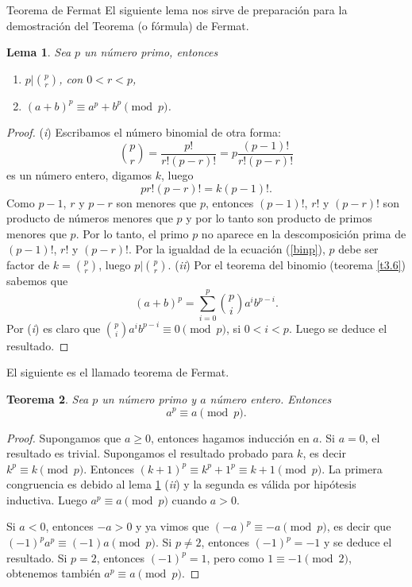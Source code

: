 \documentclass[11pt,spanish,makeidx]{amsbook}
\newtheorem{teorema}{Teorema}[section]
\newtheorem{lema}[teorema]{Lema}
\theoremstyle{definition}
\theoremstyle{remark}
\begin{document}
\begin{section}{Teorema de Fermat}  
El siguiente lema nos sirve de preparación para la demostración del Teorema (o fórmula) de Fermat.

\begin{lema} \label{l4.3} Sea $p$ un número primo, entonces
\begin{enumerate}
\item[({\em i})] $p|\binom{p}{r}$, con $0< r <p$,
\item[({\em ii})] $(a+b)^p \equiv a^p+b^p \pmod{p}$.
\end{enumerate}
\end{lema}
\begin{proof} ({\em i})  Escribamos el número binomial de otra forma: 
$$
\binom{p}{r}=\frac{p!}{r!(p-r)!}=p\frac{(p-1)!}{r!(p-r)!}
$$ 
es un número entero, digamos $k$, luego 
\begin{equation}\label{binp}
p r!(p-r)! = k(p-1)!.
\end{equation}
Como $p-1$, $r$ y $p-r$ son menores que $p$, entonces  $(p-1)!$, $r!$ y $(p-r)!$ son producto de números menores que $p$ y por lo tanto son producto de primos menores que $p$.  Por lo tanto, el primo $p$ no aparece en la descomposición prima de $(p-1)!$, $r!$ y $(p-r)!$. Por la igualdad de la ecuación (\ref{binp}), $p$ debe ser factor de $k = \binom{p}{r}$, luego $p|\binom{p}{r}$.  ({\em ii}) Por el teorema del binomio (teorema \ref{t3.6}) sabemos que
$$
(a+b)^p =\sum_{i=0}^{p} \binom{p}{i} a^ib^{p-i}.
$$
Por ({\em i}) es claro que $ \binom{p}{i} a^ib^{p-i}\equiv 0 \pmod{p}$, si $0<i<p$. Luego se deduce el resultado.
\end{proof}

El siguiente es el llamado teorema de Fermat.

\begin{teorema}\label{t4.3} Sea $p$ un número primo y $a$ número entero. Entonces
$$
a^p\equiv a\pmod{p}.
$$
\end{teorema}
\begin{proof} Supongamos que $a\ge 0$, entonces hagamos inducción en $a$. Si $a=0$, el resultado es trivial. Supongamos el resultado probado para $k$, es decir $k^p \equiv k \pmod{p}$. Entonces $(k+1)^p \equiv k^p +1^p \equiv k+1 \pmod{p}$. La primera congruencia es debido al lema \ref{l4.3} ({\em ii}) y la segunda es válida por hipótesis inductiva. Luego $a^p\equiv a\pmod{p}$ cuando $a >0$.

Si $a<0$, entonces $-a>0$ y ya vimos que $(-a)^p \equiv -a \pmod{p}$, es decir que $(-1)^pa^p \equiv (-1)a \pmod{p}$. Si $p\not=2$, entonces $(-1)^p=-1$ y se deduce el resultado. Si $p=2$, entonces $(-1)^p=1$, pero como $1\equiv -1 \pmod{2}$, obtenemos también $a^p\equiv a\pmod{p}$.
\end{proof}



\end{section}
\end{document}
